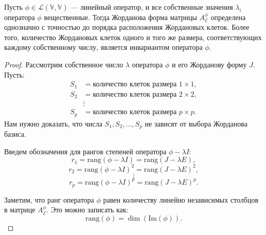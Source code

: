 \begin{shth}
    \begin{theorem}
    \leavevmode \nl 
    
    Пусть \( \phi \in \mathcal{L}(\mathbb{V}, \mathbb{V}) \) — линейный оператор, и все собственные значения \( \lambda_i \) \\оператора \( \phi \) вещественные. Тогда Жорданова форма матрицы \( A_{\mathcal{E}}^{\phi} \) определена однозначно с точностью до порядка расположения Жордановых клеток. Более того, количество Жордановых клеток одного и того же размера, соответствующих каждому собственному числу, является инвариантом оператора \( \phi \).
    \end{theorem}
\end{shth}


\begin{proof}
    Рассмотрим собственное число \( \lambda \) оператора \( \phi \) и его Жорданову форму \( J \). Пусть:
    \begin{align*}
    S_{1} &= \text{количество клеток размера } 1 \times 1, \\
    S_{2} &= \text{количество клеток размера } 2 \times 2, \\
    &\vdots \\
    S_{p} &= \text{количество клеток размера } p \times p.
\end{align*}
    Нам нужно доказать, что числа \( S_{1}, S_{2}, \ldots, S_{p} \) не зависят от выбора Жорданова базиса.

    Введем обозначения для рангов степеней оператора \( \phi - \lambda I \):
    \[
    r_{1} = \text{rang}(\phi - \lambda I) = \text{rang}(J - \lambda E),
    \]
    \[
    r_{2} = \text{rang}(\phi - \lambda I)^2 = \text{rang}(J - \lambda E)^2,
    \]
    \[
    \vdots
    \]
    \[
    r_{p} = \text{rang}(\phi - \lambda I)^p = \text{rang}(J - \lambda E)^p.
    \]

    Заметим, что ранг оператора \( \phi \) равен количеству линейно независимых столбцов в матрице \( A_{\mathcal{E}}^{\phi} \). Это можно записать как:
    \[
    \text{rang}(\phi) = \dim(\text{Im}(\phi)).
    \]
    

\end{proof}
